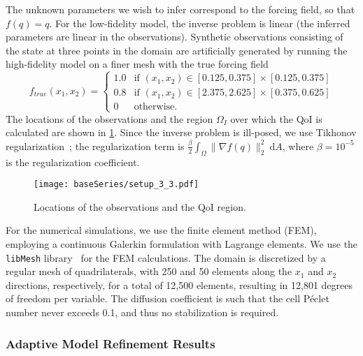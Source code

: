 The unknown parameters we wish to infer correspond to the forcing field, so that $f(q)=q$. For the low-fidelity model, the inverse problem is linear (the inferred parameters are linear in the observations). Synthetic observations consisting of the state at three points in the domain are artificially generated by running the high-fidelity model on a finer mesh with the true forcing field
%
\begin{equation}
f_{true}(x_1,x_2)=
\begin{cases}
1.0 & \textrm{if }(x_1,x_2)\in[0.125,0.375]\times[0.125,0.375] \\
0.8 & \textrm{if }(x_1,x_2)\in[2.375,2.625]\times[0.375,0.625] \\
0 & \textrm{otherwise}.
\end{cases}
\end{equation}
%
The locations of the observations and the region $\Omega_I$ over which the QoI is calculated are shown in \cref{fig:baseSetup}. Since the inverse problem is ill-posed, we use Tikhonov regularization~\cite{EngHanNeu00}; the regularization term is $\frac{\beta}{2}\int_\Omega \|\nabla f(q)\|_2^2\:\textrm{d}A$, where $\beta=10^{-5}$ is the regularization coefficient. 
%
\begin{figure}[htbp]
\centering
\texttt{[image: baseSeries/setup\_3\_3.pdf]}
\caption{Locations of the observations and the QoI region.}
\label{fig:baseSetup}
\end{figure}
%

For the numerical simulations, we use the finite element method (FEM), employing a continuous Galerkin formulation with Lagrange elements. We use the \texttt{libMesh} library~\cite{libMeshPaper} for the FEM calculations. 
The domain is discretized by a regular mesh of quadrilaterals, with 250 and 50 elements along the $x_1$ and $x_2$ directions, respectively, for a total of 12,500 elements, resulting in 12,801 degrees of freedom per variable. The diffusion coefficient is such that the cell P\'{e}clet number never exceeds 0.1, and thus no stabilization is required.
%
\subsubsection{Adaptive Model Refinement Results} \label{sec:cdvcdrBaseRef} 
%

